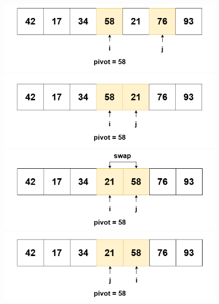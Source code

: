 \begin{enumerate}
\begin{figure}[H]
        \includegraphics[width=0.75\linewidth]{img/quick_sort/5.png}
    
        \includegraphics[width=0.75\linewidth]{img/quick_sort/6.png}
        
        \includegraphics[width=0.75\linewidth]{img/quick_sort/7.png}
        
        \includegraphics[width=0.75\linewidth]{img/quick_sort/8.png}
    \end{figure}


\end{enumerate}
